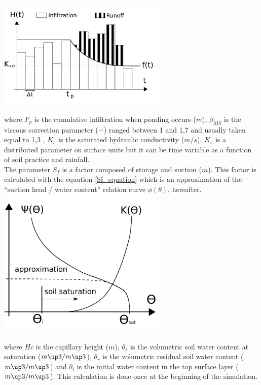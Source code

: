 \includegraphics[width=8cm]{doc/common/Separation_infiltration_ruissellement_MSeytoux.pdf}


where $F_p$ is the cumulative infiltration when ponding occurs ($m$), $\beta_{MS}$ is the viscous correction parameter ($-$) ranged between 1 and 1,7 and usually taken equal to 1,3 \cite{MorelS1984}, $K_s$ is the saturated hydraulic conductivity ($m/s$). $K_s$ is a distributed parameter on surface units but it can be time variable as a function of soil practice and rainfall.\\

The parameter $S_f$ is a factor composed of storage and suction ($m$). This factor is calculated with the equation \ref{Sf_equation} which is an approximation of the ``suction head / water content'' relation curve $\phi(\theta)$, hereafter.\\

\includegraphics[width=8cm]{doc/common/Sf_approximation.pdf}


where $Hc$ is the capillary height ($m$), $\theta_s$  is the volumetric soil water content at saturation ($m\up3/m\up3$), $\theta_r$ is the volumetric residual soil water content ($m\up3 /m\up3$) and $\theta_i$ is the initial water content in the top surface layer ($m\up3 /m\up3$). This calculation is done once at the beginning of the simulation.\\

